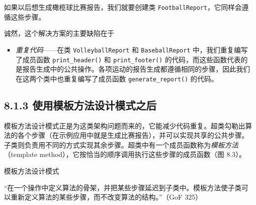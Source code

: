 如果以后想生成橄榄球比赛报告，我们就要创建类 \texttt{Football\allowbreak{}Report}，它同样会遵循这些步骤。


诚然，这个解决方案的主要缺陷在于

\begin{itemize}
\item \emph{重复代码}——在类 \texttt{Volleyball\allowbreak{}Report} 和 \texttt{Baseball\allowbreak{}Report} 中，我们重复编写了成员函数 \texttt{print\_\allowbreak{}header(\allowbreak{})\allowbreak{}} 和 \texttt{print\_\allowbreak{}footer(\allowbreak{})\allowbreak{}} 的代码，而这些函数代表的是报告生成中的公共操作。各项运动的报告生成都遵循相同的步骤，因此我们在这两个类中也重复编写了成员函数 \texttt{generate\_\allowbreak{}report(\allowbreak{})\allowbreak{}} 的代码。
\end{itemize}

\subsection{8.1.3 使用模板方法设计模式之后}

模板方法设计模式正是为这类架构问题而来的，它能减少代码重复。超类勾勒出算法的各个步骤（在示例应用中就是生成比赛报告），并可以实现共享的公共步骤。子类则负责用不同的方式实现其余步骤。超类中有一个成员函数称为\emph{模板方法}（template method），它按恰当的顺序调用执行这些步骤的成员函数（图 8.3）。

\begin{mySidebar}{模板方法设计模式}

“在一个操作中定义算法的骨架，并把某些步骤延迟到子类中。模板方法使子类可以重新定义算法的某些步骤，而不改变算法的结构。”（GoF 325）
\end{mySidebar}


